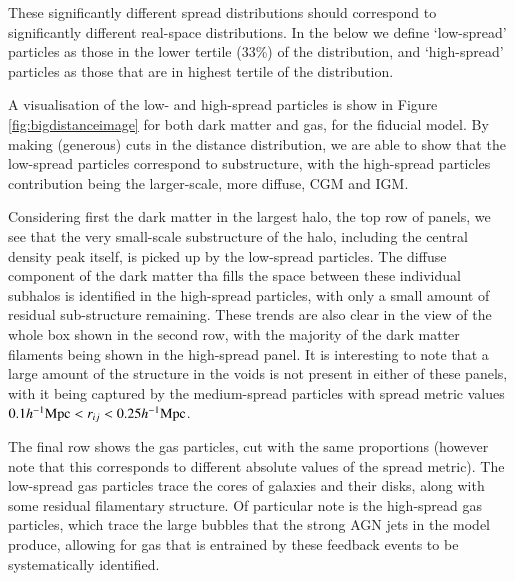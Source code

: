 These significantly different spread distributions should correspond to
significantly different real-space distributions. In the below we define
`low-spread' particles as those in the lower tertile (33\%) of the
distribution, and `high-spread' particles as those that are in highest
tertile of the distribution.

A visualisation of the low- and high-spread particles is show in Figure
\ref{fig:bigdistanceimage} for both dark matter and gas, for the fiducial
\simba{} model. By making (generous) cuts in the distance distribution, we
are able to show that the low-spread particles correspond to substructure,
with the high-spread particles contribution being the larger-scale, more
diffuse, CGM and IGM.

Considering first the dark matter in the largest halo, the top row of panels,
we see that the very small-scale substructure of the halo, including the central
density peak itself, is picked up by the low-spread particles. The
diffuse component of the dark matter tha fills the space between these individual
subhalos is identified in the high-spread particles, with only a small
amount of residual sub-structure remaining. These trends are also clear in the
view of the whole box shown in the second row, with the majority of the dark matter
filaments being shown in the high-spread panel. It is interesting to note that
a large amount of the structure in the voids is not present in either of these
panels, with it being captured by the medium-spread particles with spread
metric values $0.1h^{-1}{\rm Mpc}{} < r_{ij} < 0.25 h^{-1}{\rm Mpc}{}$.

The final row shows the gas particles, cut with the same proportions (however
note that this corresponds to different absolute values of the spread
metric). The low-spread gas particles trace the cores of galaxies and their
disks, along with some residual filamentary structure. Of particular note is
the high-spread gas particles, which trace the large bubbles that the strong
AGN jets in the \simba{} model produce, allowing for gas that is entrained by
these feedback events to be systematically identified.

